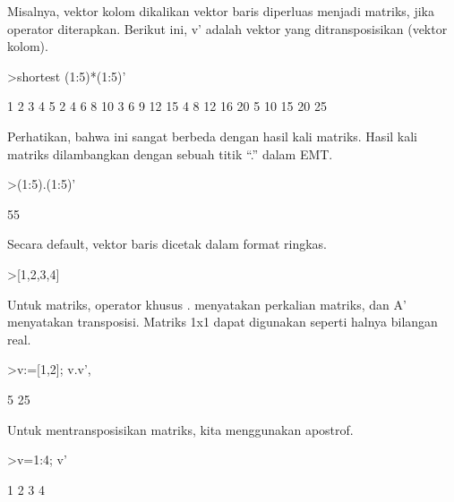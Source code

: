 \documentclass[a4paper,10pt]{article}
\begin{document}
\begin{eulernotebook}
\begin{eulercomment}
\begin{eulercomment}
\begin{eulercomment}
\begin{eulercomment}
\begin{eulercomment}
Misalnya, vektor kolom dikalikan vektor baris diperluas menjadi
matriks, jika operator diterapkan. Berikut ini, v' adalah vektor yang
ditransposisikan (vektor kolom).
\end{eulercomment}
\begin{eulerprompt}
>shortest (1:5)*(1:5)'
\end{eulerprompt}
\begin{euleroutput}
       1      2      3      4      5 
       2      4      6      8     10 
       3      6      9     12     15 
       4      8     12     16     20 
       5     10     15     20     25 
\end{euleroutput}
\begin{eulercomment}
Perhatikan, bahwa ini sangat berbeda dengan hasil kali matriks. Hasil
kali matriks dilambangkan dengan sebuah titik “.” dalam EMT.
\end{eulercomment}
\begin{eulerprompt}
>(1:5).(1:5)'
\end{eulerprompt}
\begin{euleroutput}
  55
\end{euleroutput}
\begin{eulercomment}
Secara default, vektor baris dicetak dalam format ringkas.
\end{eulercomment}
\begin{eulerprompt}
>[1,2,3,4]
\end{eulerprompt}
\begin{euleroutput}
  [1,  2,  3,  4]
\end{euleroutput}
\begin{eulercomment}
Untuk matriks, operator khusus . menyatakan perkalian matriks, dan A'
menyatakan transposisi. Matriks 1x1 dapat digunakan seperti halnya
bilangan real.
\end{eulercomment}
\begin{eulerprompt}
>v:=[1,2]; v.v', %
\end{eulerprompt}
\begin{euleroutput}
  5
  25
\end{euleroutput}
\begin{eulercomment}
Untuk mentransposisikan matriks, kita menggunakan apostrof.
\end{eulercomment}
\begin{eulerprompt}
>v=1:4; v'
\end{eulerprompt}
\begin{euleroutput}
              1 
              2 
              3 
              4 

\end{euleroutput}
\end{eulercomment}
\end{eulercomment}
\end{eulercomment}
\end{eulercomment}
\end{eulernotebook}
\end{document}
